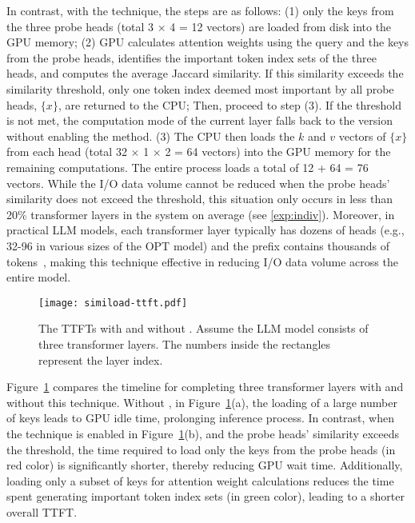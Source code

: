 In contrast, with the \techa{} technique, the steps are as follows:
(1) only the keys from the three probe heads (total 3 $\times$ 4 = 12 vectors)
are loaded from disk into the GPU memory; 
(2) GPU calculates attention weights using the query and the keys from the probe heads, 
identifies the important token index sets of the three heads, 
and computes the average Jaccard similarity. 
If this similarity exceeds the similarity threshold, only one token index 
deemed most important by all probe heads, $\{x\}$, are returned to the CPU; Then, proceed to step (3).
If the threshold is not met, the computation mode of the current layer falls back to the version without enabling the \techa{} method.
(3) The CPU then loads the \(k\) and \(v\) vectors of $\{x\}$ from each head
(total 32 $\times$ 1 $\times$ 2 = 64 vectors) into the GPU  memory for the remaining
computations. The entire process loads a total of 12 + 64 = 76 vectors.
While the I/O data volume cannot be reduced when the probe heads' similarity does not exceed the threshold, this situation only occurs in less than 20\% transformer layers in the \pname{} system on average (see \cref{exp:indiv}). Moreover, in practical LLM models, each transformer layer typically has dozens of heads (e.g., 32-96 in various sizes of the OPT model) and the prefix contains thousands of tokens~\cite{chunkattention-arxiv24, cachegen-sigcomm24}, making this technique effective in reducing I/O data volume across the entire model.


\begin{figure}
	\centering
	\texttt{[image: simiload-ttft.pdf]}
	\vspace{-0.2in}
	\caption{The TTFTs with and without \techa{}. Assume the LLM model consists of three transformer layers. The numbers inside the rectangles represent the layer index.}
	\label{fig:simiload-ttft}
\end{figure}


Figure~\ref{fig:simiload-ttft} compares the timeline for completing three transformer layers with and without this technique. Without \techa{}, in Figure~\ref{fig:simiload-ttft}(a), the loading of a large number of keys leads to GPU idle time, prolonging inference process. In contrast, when the technique is enabled in Figure~\ref{fig:simiload-ttft}(b), and the probe heads’ similarity exceeds the threshold, the time required to load only the keys from the probe heads (in red color) is significantly shorter, thereby reducing GPU wait time. Additionally, loading only a subset of keys for attention weight calculations reduces the time spent generating important token index sets (in green color), leading to a shorter overall TTFT.

